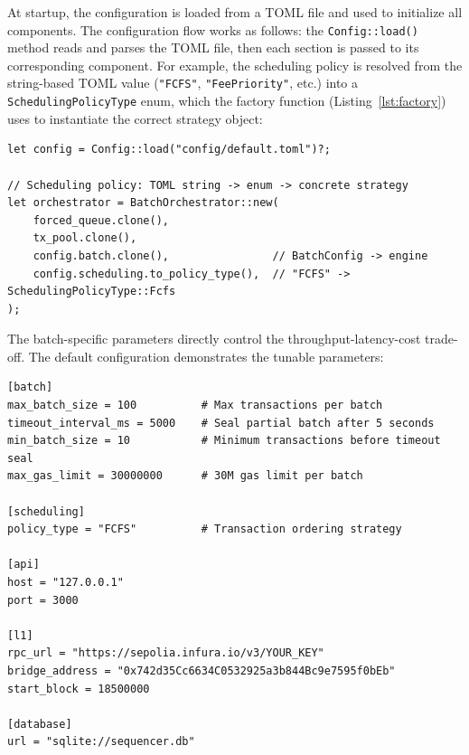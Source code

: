 At startup, the configuration is loaded from a TOML file and used to initialize all components. The configuration flow works as follows: the \texttt{Config::load()} method reads and parses the TOML file, then each section is passed to its corresponding component. For example, the scheduling policy is resolved from the string-based TOML value (\texttt{"FCFS"}, \texttt{"FeePriority"}, etc.) into a \texttt{SchedulingPolicyType} enum, which the factory function (Listing~\ref{lst:factory}) uses to instantiate the correct strategy object:

\begin{lstlisting}[style=rustStyle, caption={Configuration to component wiring}, label={lst:config-wiring}]
let config = Config::load("config/default.toml")?;

// Scheduling policy: TOML string -> enum -> concrete strategy
let orchestrator = BatchOrchestrator::new(
    forced_queue.clone(),
    tx_pool.clone(),
    config.batch.clone(),                // BatchConfig -> engine
    config.scheduling.to_policy_type(),  // "FCFS" -> SchedulingPolicyType::Fcfs
);
\end{lstlisting}

The batch-specific parameters directly control the throughput-latency-cost trade-off. The default configuration demonstrates the tunable parameters:

\begin{lstlisting}[language={}, caption={Default sequencer configuration (\texttt{config/default.toml})}, label={lst:default-config}]
[batch]
max_batch_size = 100          # Max transactions per batch
timeout_interval_ms = 5000    # Seal partial batch after 5 seconds
min_batch_size = 10           # Minimum transactions before timeout seal
max_gas_limit = 30000000      # 30M gas limit per batch

[scheduling]
policy_type = "FCFS"          # Transaction ordering strategy

[api]
host = "127.0.0.1"
port = 3000

[l1]
rpc_url = "https://sepolia.infura.io/v3/YOUR_KEY"
bridge_address = "0x742d35Cc6634C0532925a3b844Bc9e7595f0bEb"
start_block = 18500000

[database]
url = "sqlite://sequencer.db"
\end{lstlisting}

